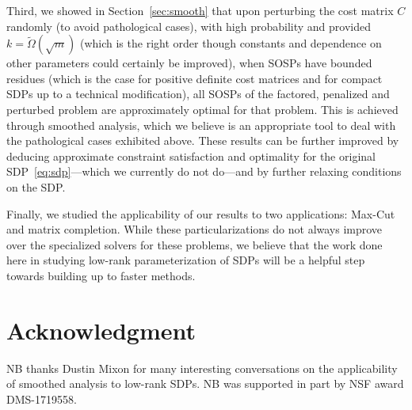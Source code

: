\documentclass{article}
\begin{document}
Third, we showed in Section~\ref{sec:smooth} that upon perturbing the cost matrix $C$ randomly (to avoid pathological cases), with high probability and provided $k = \tilde \Omega(\sqrt{m})$ (which is the right order though constants and dependence on other parameters could certainly be improved), when SOSPs have bounded residues (which is the case for positive definite cost matrices and for compact SDPs up to a technical modification), all SOSPs of the factored, penalized and perturbed problem are approximately optimal for that problem. This is achieved through smoothed analysis, which we believe is an appropriate tool to deal with the pathological cases exhibited above. These results can be further improved by deducing approximate constraint satisfaction and optimality for the original SDP~\eqref{eq:sdp}---which we currently do not do---and by further relaxing conditions on the SDP.

Finally, we studied the applicability of our results to two applications: Max-Cut and matrix completion. While these particularizations do not always improve over the specialized solvers for these problems, we believe that the work done here in studying low-rank parameterization of SDPs will be a helpful step towards building up to faster methods.

\section*{Acknowledgment}

NB thanks Dustin Mixon for many interesting conversations on the applicability of smoothed analysis to low-rank SDPs. NB was supported in part by NSF award DMS-1719558.




\clearpage
\appendix






\end{document}
